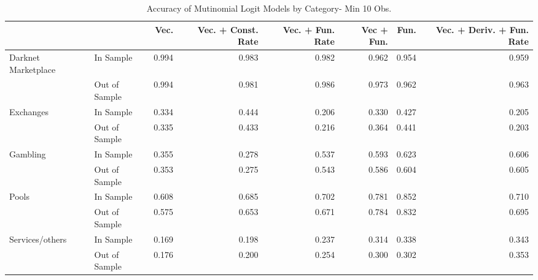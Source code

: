 \begin{table}[ht]
\centering
\begin{tabular}{llrrrrrr}
  \hline
 &  & Vec. & Vec. + Const. Rate & Vec. + Fun. Rate & Vec + Fun. & Fun. & Vec. + Deriv. + Fun. Rate \\ 
  \hline
Darknet Marketplace & In Sample & 0.994 & 0.983 & 0.982 & 0.962 & 0.954 & 0.959 \\ 
   & Out of Sample & 0.994 & 0.981 & 0.986 & 0.973 & 0.962 & 0.963 \\ 
  Exchanges & In Sample & 0.334 & 0.444 & 0.206 & 0.330 & 0.427 & 0.205 \\ 
   & Out of Sample & 0.335 & 0.433 & 0.216 & 0.364 & 0.441 & 0.203 \\ 
  Gambling & In Sample & 0.355 & 0.278 & 0.537 & 0.593 & 0.623 & 0.606 \\ 
   & Out of Sample & 0.353 & 0.275 & 0.543 & 0.586 & 0.604 & 0.605 \\ 
  Pools & In Sample & 0.608 & 0.685 & 0.702 & 0.781 & 0.852 & 0.710 \\ 
   & Out of Sample & 0.575 & 0.653 & 0.671 & 0.784 & 0.832 & 0.695 \\ 
  Services/others & In Sample & 0.169 & 0.198 & 0.237 & 0.314 & 0.338 & 0.343 \\ 
   & Out of Sample & 0.176 & 0.200 & 0.254 & 0.300 & 0.302 & 0.353 \\ 
   \hline
\end{tabular}
\caption{Accuracy of Mutinomial Logit Models by Category- Min 10 Obs.} 
\label{multi_10obs_acc_cat}
\end{table}
